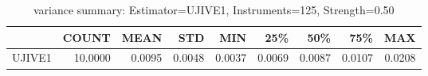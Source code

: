 \begin{table}[ht]
\centering
\caption{variance summary: Estimator=UJIVE1, Instruments=125, Strength=0.50}
\begin{tabular}{lrrrrrrrr}
\toprule
 & COUNT & MEAN & STD & MIN & 25\% & 50\% & 75\% & MAX \\
\midrule
UJIVE1 & 10.0000 & 0.0095 & 0.0048 & 0.0037 & 0.0069 & 0.0087 & 0.0107 & 0.0208 \\
\bottomrule
\end{tabular}
\end{table}
